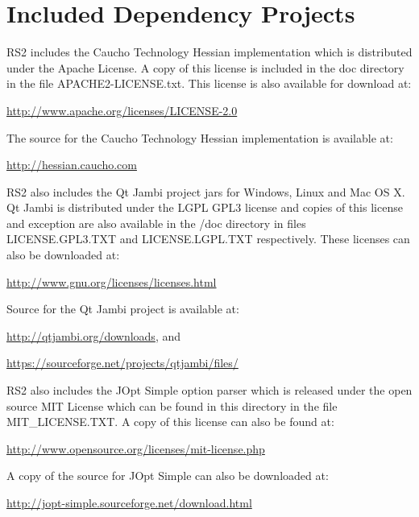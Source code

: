 \documentclass[10pt]{article}
\begin{document}
\pagebreak
\section{Included Dependency Projects}
RS2 includes the Caucho Technology Hessian implementation which is distributed
under the Apache License. A copy of this license is included in the doc
directory in the file APACHE2-LICENSE.txt. This license is also available for
download at:

\noindent
\hyperref[http://www.apache.org/licenses/LICENSE-2.0]{\color{blue}http://www.apache.org/licenses/LICENSE-2.0}

\bigbreak \noindent
The source for the Caucho Technology Hessian implementation is available at:

\noindent
\hyperref[http://hessian.caucho.com]{\color{blue}http://hessian.caucho.com}

\bigbreak \noindent
RS2 also includes the Qt Jambi project jars for Windows, Linux and Mac OS X.  Qt
Jambi is distributed under the LGPL GPL3 license and copies of this license and
exception are also available in the /doc directory in files LICENSE.GPL3.TXT and
LICENSE.LGPL.TXT respectively. These licenses can also be downloaded at:

\noindent
\hyperref[http://www.gnu.org/licenses/licenses.html]{\color{blue}http://www.gnu.org/licenses/licenses.html}

\bigbreak \noindent
Source for the Qt Jambi project is available at:

\noindent
\hyperref[http://qtjambi.org/downloads]{\color{blue}http://qtjambi.org/downloads}, and

\noindent
\hyperref[https://sourceforge.net/projects/qtjambi/files/]{\color{blue}https://sourceforge.net/projects/qtjambi/files/}

\bigbreak \noindent
RS2 also includes the JOpt Simple option parser which is released under
the open source MIT License which can be found in this directory in the file
MIT\_LICENSE.TXT.  A copy of this license can also be found at:

\noindent
\hyperref[http://www.opensource.org/licenses/mit-license.php]{\color{blue}http://www.opensource.org/licenses/mit-license.php}

\bigbreak \noindent   
A copy of the source for JOpt Simple can also be downloaded at:

\noindent
\hyperref[http://jopt-simple.sourceforge.net/download.html]{\color{blue}http://jopt-simple.sourceforge.net/download.html}
\end{document}
